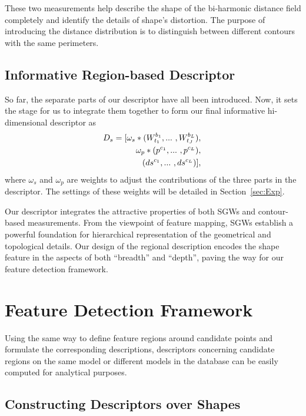 These two measurements help describe the shape of the bi-harmonic
distance field completely and identify the details of shape's
distortion. The purpose of introducing the distance distribution is
to distinguish between different contours with the same perimeters.

\subsection{Informative Region-based Descriptor}

So far, the separate parts of our descriptor have all been introduced.
Now, it sets the stage for us to integrate them together to form our
final informative hi-dimensional descriptor as
\begin{equation}
\label{eq:desFinal}
\begin{aligned}
  \hspace{-0.5mm}
  D_s =  [\omega_s*(W_{t_1}^{b_1},...\ ,W_{t_J}^{b_L}),\\
  \omega_p*(p^{c_1},...\ ,p^{c_L}),\\
  (ds^{c_1},...\ ,ds^{c_L})],
\end{aligned}
\end{equation}
where $\omega_s$ and $\omega_p$ are weights to adjust the
contributions of the three parts in the descriptor. The settings of
these weights will be detailed in Section~\ref{sec:Exp}.

Our descriptor integrates the attractive properties of both SGWs and
contour-based measurements. From the viewpoint of feature mapping,
SGWs establish a powerful foundation for hierarchical representation
of the geometrical and topological details. Our design of the
regional description encodes the shape feature in the aspects of both
``breadth'' and ``depth'', paving the way for our feature detection
framework.

\section{Feature Detection Framework}
\label{sec:Framework}

Using the same way to define feature regions around candidate points
and formulate the corresponding descriptions, descriptors concerning
candidate regions on the same model or different models in the
database can be easily computed for analytical purposes.

\subsection{Constructing Descriptors over Shapes}

